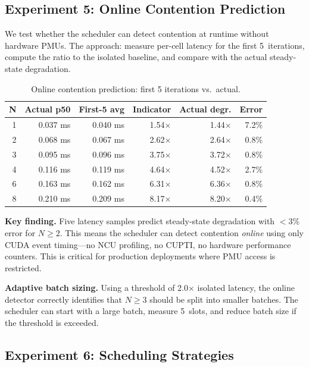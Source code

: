 \subsection{Experiment 5: Online Contention Prediction}
\label{sec:exp5}

We test whether the scheduler can detect contention at runtime without hardware PMUs. The approach: measure per-cell latency for the first 5~iterations, compute the ratio to the isolated baseline, and compare with the actual steady-state degradation.

\begin{table}[h]
\centering
\small
\caption{Online contention prediction: first 5 iterations vs.\ actual.}
\label{tab:online}
\begin{tabular}{@{}rrrrrr@{}}
\toprule
N & Actual p50 & First-5 avg & Indicator & Actual degr. & Error \\
\midrule
1 & 0.037 ms & 0.040 ms & 1.54$\times$ & 1.44$\times$ & 7.2\% \\
2 & 0.068 ms & 0.067 ms & 2.62$\times$ & 2.64$\times$ & 0.8\% \\
3 & 0.095 ms & 0.096 ms & 3.75$\times$ & 3.72$\times$ & 0.8\% \\
4 & 0.116 ms & 0.119 ms & 4.64$\times$ & 4.52$\times$ & 2.7\% \\
6 & 0.163 ms & 0.162 ms & 6.31$\times$ & 6.36$\times$ & 0.8\% \\
8 & 0.210 ms & 0.209 ms & 8.17$\times$ & 8.20$\times$ & 0.4\% \\
\bottomrule
\end{tabular}
\end{table}

\textbf{Key finding.} Five latency samples predict steady-state degradation with $<$3\% error for $N \geq 2$. This means the scheduler can detect contention \emph{online} using only CUDA event timing---no NCU profiling, no CUPTI, no hardware performance counters. This is critical for production deployments where PMU access is restricted.

\textbf{Adaptive batch sizing.} Using a threshold of 2.0$\times$ isolated latency, the online detector correctly identifies that $N \geq 3$ should be split into smaller batches. The scheduler can start with a large batch, measure 5~slots, and reduce batch size if the threshold is exceeded.

\subsection{Experiment 6: Scheduling Strategies}
\label{sec:exp6}

